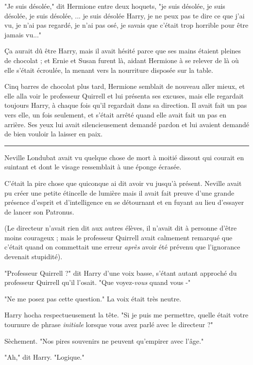 "Je suis désolée," dit Hermione entre deux hoquets, "je suis désolée, je suis désolée, je suis désolée, ... je suis désolée Harry, je ne peux pas te dire ce que j'ai vu, je n'ai pas regardé, je n'ai pas osé, je savais que c'était trop horrible pour être jamais vu..."

Ça aurait dû être Harry, mais il avait hésité parce que ses mains étaient pleines de chocolat ; et Ernie et Susan furent là, aidant Hermione à se relever de là où elle s'était écroulée, la menant vers la nourriture disposée sur la table.

Cinq barres de chocolat plus tard, Hermione semblait de nouveau aller mieux, et elle alla voir le professeur Quirrell et lui présenta ses excuses, mais elle regardait toujours Harry, à chaque fois qu'il regardait dans sa direction. Il avait fait un pas vers elle, un fois seulement, et s'était arrêté quand elle avait fait un pas en arrière. Ses yeux lui avait silencieusement demandé pardon et lui avaient demandé de bien vouloir la laisser en paix.
\par\noindent\rule{\textwidth}{0.4pt}
Neville Londubat avait vu quelque chose de mort à moitié dissout qui courait en suintant et dont le visage ressemblait à une éponge écrasée.

C'était la pire chose que quiconque ai dit avoir vu jusqu'à présent. Neville avait pu créer une petite étincelle de lumière mais il avait fait preuve d'une grande présence d'esprit et d'intelligence en se détournant et en fuyant au lieu d'essayer de lancer son Patronus.

(Le directeur n'avait rien dit aux autres élèves, il n'avait dit à personne d'être moins courageux ; mais le professeur Quirrell avait calmement remarqué que c'était quand on commettait une erreur \emph{après}  avoir été prévenu que l'ignorance devenait stupidité).

"Professeur Quirrell ?" dit Harry d'une voix basse, s'étant autant approché du professeur Quirrell qu'il l'osait. "Que voyez-\emph{vous}  quand vous -"

"Ne me posez pas cette question." La voix était très neutre.

Harry hocha respectueusement la tête. "Si je puis me permettre, quelle était votre tournure de phrase \emph{initiale}  lorsque vous avez parlé avec le directeur ?"

Sèchement. "Nos pires souvenirs ne peuvent qu'empirer avec l'âge."

"Ah," dit Harry. "Logique."

